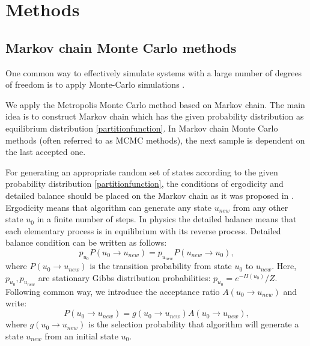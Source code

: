 \chapter{Methods} \label{ch:method}



\section{Markov chain Monte Carlo methods}
 One common way to effectively simulate systems with a large number of degrees of freedom is to apply Monte-Carlo simulations \cite{newman1999monte}. 
 
 We apply the Metropolis Monte Carlo method based on Markov chain. The main idea is to construct Markov chain which has the given probability distribution as equilibrium distribution \eqref{partitionfunction}. In Markov chain Monte Carlo methods (often referred to as MCMC methods),  the next sample is dependent on the last accepted one.  
 
  \par For generating an appropriate random set of states according to the given probability distribution \eqref{partitionfunction}, the conditions of ergodicity and detailed balance should be placed on the Markov chain as it was proposed in \cite{doi:10.1063/1.1699114}.  
  Ergodicity means that algorithm can generate any state $u_{new}$ from any other state $u_0 $ in a finite number of steps. In physics the detailed balance means that each elementary process is in equilibrium with its reverse process. Detailed balance condition can be written as follows:
  \begin{equation}
  \label{detailedbalance}
  p_{u_0} P(u_0 \rightarrow u_{new} ) = p_{u_{new}} P( u_{new} \rightarrow u_0),
  \end{equation}
  where $P(u_0\rightarrow u_{new} )$ is the transition probability from state $u_0$ to $u_{new}$. Here, $p_{u_0},p_{u_{new}}$ are stationary Gibbs distribution probabilities: $p_{u_0} = e ^{-H(u_0)}/Z $.   Following common way, we introduce the acceptance ratio $A(u_0 \rightarrow u_{new})$ and write:
  \begin{equation*}
  P(u_0 \rightarrow u_{new}) = g(u_0 \rightarrow u_{new}) A(u_0 \rightarrow u_{new}),
  \end{equation*}
where $g(u_0  \rightarrow u_{new} )$ is the selection probability that algorithm will generate a state $u_{new}$ from an initial state $u_0$. 

